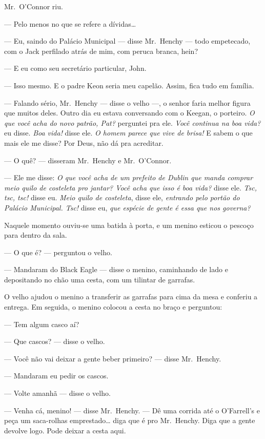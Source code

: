 Mr.~O’Connor riu.

--- Pelo menos no que se refere a dívidas\ldots{}

--- Eu, saindo do Palácio Municipal --- disse Mr.~Henchy --- todo empetecado,
com o Jack perfilado atrás de mim, com peruca branca, hein?

--- E eu como seu secretário particular, John.

--- Isso mesmo.  E o padre Keon seria meu capelão.  Assim, fica tudo em
família.

--- Falando sério, Mr.~Henchy --- disse o velho ---, o senhor faria melhor
figura que muitos deles.  Outro dia eu estava conversando com o Keegan, o
porteiro.  \textit{O que você acha do novo patrão, Pat?} perguntei pra ele.
\textit{Você continua na boa vida?} eu disse.  \textit{Boa vida!} disse ele.
\textit{O homem parece que vive de brisa!} E sabem o que mais ele me
disse? Por Deus, não dá pra acreditar.

--- O quê? --- disseram Mr.~Henchy e Mr.~O’Connor.

--- Ele me disse: \textit{O que você acha de um prefeito de Dublin que
manda comprar meio quilo de costeleta pro jantar?  Você acha que isso
é boa vida?} disse ele.  \textit{Tsc, tsc, tsc!} disse eu.  \textit{Meio quilo
de costeleta}, disse ele, \textit{entrando pelo portão do Palácio
Municipal.  Tsc!} disse eu, \textit{que espécie de gente é essa que nos
governa?}

Naquele momento ouviu-se uma batida à porta, e um menino esticou o pescoço para
dentro da sala.

--- O que é? --- perguntou o velho.

--- Mandaram do Black Eagle --- disse o menino, caminhando de lado e
depositando no chão uma cesta, com um tilintar de garrafas.

O velho ajudou o menino a transferir as garrafas para cima da mesa e conferiu a
entrega.  Em seguida, o menino colocou a cesta no braço e perguntou:

--- Tem algum casco aí?

--- Que cascos? --- disse o velho.

--- Você não vai deixar a gente beber primeiro? --- disse Mr.~Henchy.

--- Mandaram eu pedir os cascos.

--- Volte amanhã --- disse o velho.

--- Venha cá, menino! --- disse Mr.~Henchy.  --- Dê uma corrida até o
O’Farrell’s e peça um saca-rolhas emprestado\ldots{} diga que é pro Mr.~Henchy.  
Diga que a gente devolve logo.  Pode deixar a cesta aqui.

